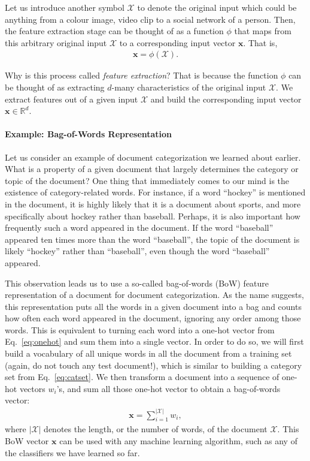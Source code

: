 \documentclass{report}
\newcommand{\vect}[1]{\mathbf{#1}}
\newcommand{\vx}[0]{\vect{x}}
\newcommand{\RR}[0]{\mathbb{R}}
\begin{document}
Let us introduce another symbol $\mathcal{X}$ to denote the original input which
could be anything from a colour image, video clip to a social network of a
person. Then, the feature extraction stage can be thought of as a function
$\phi$ that maps from this arbitrary original input $\mathcal{X}$ to a
corresponding input vector $\vx$. That is,
\begin{align*}
    \vx = \phi(\mathcal{X}).
\end{align*}

Why is this process called {\it feature extraction}? That is because the
function $\phi$ can be thought of as extracting $d$-many characteristics of the
original input $\mathcal{X}$. We extract features out of a given input
$\mathcal{X}$ and build the corresponding input vector $\vx \in \RR^d$.

\paragraph{Example: Bag-of-Words Representation}

Let us consider an example of document categorization we learned about earlier.
What is a property of a given document that largely determines the category or
topic of the document? One thing that immediately comes to our mind is the
existence of category-related words. For instance, if a word ``hockey'' is
mentioned in the document, it is highly likely that it is a document about
sports, and more specifically about hockey rather than baseball. Perhaps, it is
also important how frequently such a word appeared in the document. If the word
``baseball'' appeared ten times more than the word ``baseball'', the topic of
the document is likely ``hockey'' rather than ``baseball'', even though the word
``baseball'' appeared. 

This observation leads us to use a so-called bag-of-words (BoW) feature
representation of a document for document categorization. As the name suggests,
this representation puts all the words in a given document into a bag and counts
how often each word appeared in the document, ignoring any order among those
words. This is equivalent to turning each word into a one-hot vector from
Eq.~\eqref{eq:onehot} and sum them into a single vector. In order to do so, we
will first build a vocabulary of all unique words in all the document from a
training set (again, do not touch any test document!), which is similar to
building a category set from Eq.~\eqref{eq:catset}. We then transform a document
into a sequence of one-hot vectors $w_i$'s, and sum all those one-hot vector to
obtain a bag-of-words vector:
\begin{align*}
    \vx = \sum_{i=1}^{|\mathcal{X}|} w_i,
\end{align*}
where $|\mathcal{X}|$ denotes the length, or the number of words, of the
document $\mathcal{X}$. This BoW vector $\vx$ can be used with any machine
learning algorithm, such as any of the classifiers we have learned so far.
\end{document}
